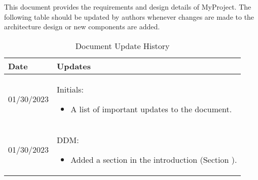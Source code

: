 This document provides the requirements and design details of MyProject.
The following table should be
updated by authors whenever changes are made to the architecture
design or new components are added.

\begin{longtable}{|l||p{13.5cm}|}
	\caption{Document Update History \label{Table::UpdateHistory}} \\
	\hline
	\textbf{Date} & \textbf{Updates}                               \\
	\hline
	\endhead

	01/30/2023    & Initials:
	\begin{itemize}[topsep=0pt,itemsep=0pt,parsep=0pt,partopsep=0pt,leftmargin=12pt]
		\item A list of important updates to the document.
	\end{itemize}
	\\ \hline

	01/30/2023    & DDM:
	\begin{itemize}[topsep=0pt,itemsep=0pt,parsep=0pt,partopsep=0pt,leftmargin=12pt]
		\item Added a section in the introduction (Section ). %
	\end{itemize}
	\\ \hline
\end{longtable}


